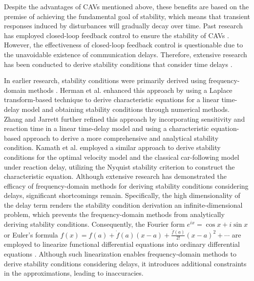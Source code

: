 \documentclass[a4paper]{cas-sc}
\begin{document}
Despite the advantages of CAVs mentioned above, these benefits are based on the premise of achieving the fundamental goal of stability, which means that transient responses induced by disturbances will gradually decay over time. Past research has employed closed-loop feedback control to ensure the stability of CAVs \citep{eyre1998simplified,will1997modelling}. However, the effectiveness of closed-loop feedback control is questionable due to the unavoidable existence of communication delays. Therefore, extensive research has been conducted to derive stability conditions that consider time delays \citep{Wang2018a,hua2022stability,wang2022damping}.


In earlier research, stability conditions were primarily derived using frequency-domain methods \citep{chandler1958traffic,Li2019yongfu}. Herman et al. \citep{herman1959traffic, gazis1963analytical} enhanced this approach by using a Laplace transform-based technique to derive characteristic equations for a linear time-delay model and obtaining stability conditions through numerical methods. Zhang and Jarrett \citep{zhang1997stability, jarrett1993dynamic} further refined this approach by incorporating sensitivity and reaction time in a linear time-delay model and using a characteristic equation-based approach to derive a more comprehensive and analytical stability condition. Kamath et al. \citep{kamath2015car} employed a similar approach to derive stability conditions for the optimal velocity model and the classical car-following model under reaction delay, utilizing the Nyquist stability criterion to construct the characteristic equation. Although extensive research has demonstrated the efficacy of frequency-domain methods for deriving stability conditions considering delays, significant shortcomings remain. Specifically, the high dimensionality of the delay term renders the stability condition derivation an infinite-dimensional problem, which prevents the frequency-domain methods from analytically deriving stability conditions. Consequently, the Fourier form $e^{ix} =\cos{x}+ i \sin{x}$ or Euler's formula $f(x)=f(a)+\dot f(a)(x-a)+\frac{\ddot f(a)}{2!}(x-a)^2+\cdots$ are employed to linearize functional differential equations into ordinary differential equations \citep{lhachemi2020feedback}. Although such linearization enables frequency-domain methods to derive stability conditions considering delays, it introduces additional constraints in the approximations, leading to inaccuracies.
\end{document}

